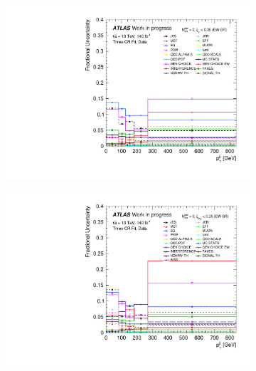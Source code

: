 \begin{figure}[t]
\begin{subfigure}[b]{0.48\textwidth}
    \includegraphics[width=\textwidth]{plots/diffx/final/data/3cr/Systematic_Uncertainties_data_jj_pt_3cr_QCD_Sh2211_0p01sigma.pdf}
    \caption{}
\end{subfigure}
\hfill
\begin{subfigure}[b]{0.48\textwidth}
    \centering
    \includegraphics[width=\textwidth]{plots/diffx/final/unfolded/3cr/Systematic_Uncertainties_data_unfolded_jj_pt_3cr_QCD_Sh2211_0p01sigma.pdf}
    \caption{}
\end{subfigure}
\begin{subfigure}[b]{0.48\textwidth}
    \centering

\end{subfigure}
\end{figure}
